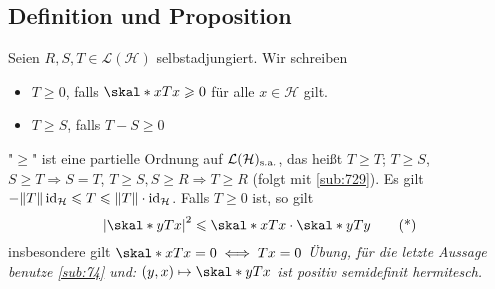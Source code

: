 \subsection{Definition und Proposition} %
\label{sub:731}
Seien $R,S,T \in \mathcal{L}(\mathcal{H})$ selbstadjungiert. Wir schreiben 
\begin{itemize}
	\item $T \ge 0$, falls $\skal*{x}{T x} \ge 0$ für alle $x \in \mathcal{H}$ gilt.
	\item $T \ge S$, falls $T-S \ge 0$
\end{itemize}
"$\ge$" ist eine partielle Ordnung auf $\mathcal{L}(\mathcal{H})_{\mathrm{s.a.}}$, das heißt $T \ge T$; $T \ge S$, $S \ge T \Rightarrow S=T$, $T \ge S, S \ge R \Rightarrow T \ge R$ (folgt mit \ref{sub:729}).
Es gilt $-\norm{T} \id_{\mathcal{H}} \le T  \le \norm{T} \cdot \id_{\mathcal{H}}$. Falls $T \ge 0$ ist, so gilt 
\begin{equation*}
	\abs*{\skal*{y}{T x}}^2 \le  \skal*{x}{T x} \cdot \skal*{y}{T y} \label{eq:731} \tag{*}
\end{equation*}
insbesondere gilt $\skal*{x}{T x}=0 \iff T x=0$
\emph{Übung, für die letzte Aussage benutze \ref{sub:74} und: $(y,x) \mapsto \skal*{y}{T x}$ ist positiv semidefinit hermitesch.}

